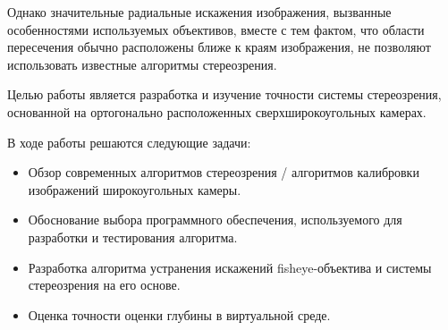 Однако значительные радиальные искажения изображения, вызванные особенностями используемых объективов, вместе с тем фактом, что области пересечения 
обычно расположены ближе к краям изображения, не позволяют использовать известные алгоритмы стереозрения.                                       %

Целью работы является разработка и изучение точности системы стереозрения, основанной на ортогонально расположенных сверхширокоугольных камерах.

В ходе работы решаются следующие задачи:
\begin{itemize}     %
    \item Обзор современных алгоритмов стереозрения / алгоритмов калибровки изображений широкоугольных камеры.
    \item Обоснование выбора программного обеспечения, используемого для разработки и тестирования алгоритма. 
    \item Разработка алгоритма устранения искажений fisheye-объектива и системы стереозрения на его основе.                                     %
    \item Оценка точности оценки глубины в виртуальной среде.  
\end{itemize}


\clearpage